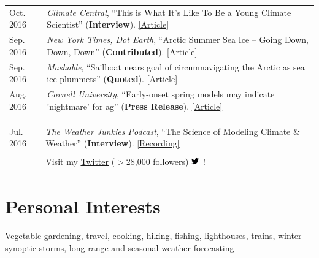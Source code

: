 \documentclass[margin,line,palatino,courier,10pt]{res}
\begin{document}
\begin{resume}
\begin{tabular}{@{}p{0.9in}p{4in}}
Oct. 2016 & \textit{Climate Central}, ``This is What It's Like To Be a Young Climate Scientist'' (\textbf{Interview}). \href{http://www.climatecentral.org/news/young-climate-scientists-interviews-20799}{[Article]}\\
Sep. 2016 & \textit{New York Times, Dot Earth}, ``Arctic Summer Sea Ice -- Going Down, Down, Down'' (\textbf{Contributed}). \href{http://dotearth.blogs.nytimes.com/2016/09/16/arctic-summer-sea-ice-going-down-down-down/?module=BlogPost-ReadMore&version=Blog\%20Main&action=Click&contentCollection=arctic&pgtype=Blogs&region=Body&_r=1#more-58318}{[Article]}\\
Sep. 2016 & \textit{Mashable}, ``Sailboat nears goal of circumnavigating the Arctic as sea ice plummets'' (\textbf{Quoted}). \href{http://mashable.com/2016/09/01/sailboat-arctic-ice-melt-open-water/#s7nzft8m6sqB}{[Article]}\\
Aug. 2016 & \textit{Cornell University}, ``Early-onset spring models may indicate 'nightmare' for ag'' (\textbf{Press Release}). \href{http://www.news.cornell.edu/stories/2016/08/early-onset-spring-models-may-indicate-nightmare-ag}{[Article]}\\
\end{tabular}
\begin{tabular}{@{}p{0.9in}p{4in}}
Jul. 2016 & \textit{The Weather Junkies Podcast}, ``The Science of Modeling Climate \& Weather'' (\textbf{Interview}). \href{https://www.youtube.com/watch?v=vgT5P9zC91U}{[Recording]}\\\\

& Visit my \href{https://twitter.com/ZLabe}{Twitter} ($>$28,000 followers) \includegraphics[height=9pt]{twitter.png}\ !\\
\end{tabular}

\vspace{-0.1in}
\noindent\textcolor{Cerulean}{\makebox[\linewidth][r]{\rule{\textwidth}{5pt}}}
\vspace{-0.3in}
\section{\sc \textcolor{Cerulean}{\large{\textbf{Personal Interests}}}}
Vegetable gardening, travel, cooking, hiking, fishing, lighthouses, trains, winter synoptic storms, long-range and seasonal weather forecasting

\end{resume}
\end{document}
